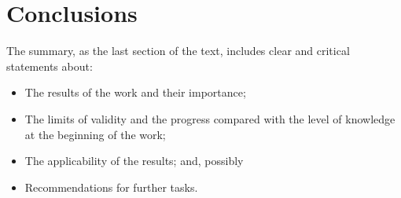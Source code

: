 \chapter{Conclusions}

The summary, as the last section of the text, includes clear and critical statements about:
\begin{itemize}
  \item The results of the work and their importance;
  \item The limits of validity and the progress compared with the level of knowledge at the beginning of the work;
  \item The applicability of the results; and, possibly
  \item Recommendations for further tasks.
\end{itemize}